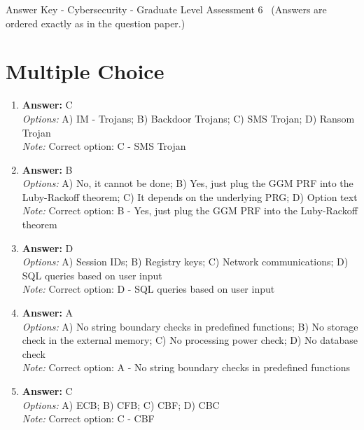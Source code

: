 \documentclass[12pt]{article}
\begin{document}
\begin{center}
Answer Key - Cybersecurity - Graduate Level Assessment 6 \
\small (Answers are ordered exactly as in the question paper.)
\end{center}

\section*{Multiple Choice}
\begin{enumerate}[label=\arabic*.]
\item \textbf{Answer:} C
\\ \textit{Options:} A) IM - Trojans; B) Backdoor Trojans; C) SMS Trojan; D) Ransom Trojan
\\ \textit{Note:} Correct option: C - SMS Trojan
\item \textbf{Answer:} B
\\ \textit{Options:} A) No, it cannot be done; B) Yes, just plug the GGM PRF into the Luby-Rackoff theorem; C) It depends on the underlying PRG; D) Option text
\\ \textit{Note:} Correct option: B - Yes, just plug the GGM PRF into the Luby-Rackoff theorem
\item \textbf{Answer:} D
\\ \textit{Options:} A) Session IDs; B) Registry keys; C) Network communications; D) SQL queries based on user input
\\ \textit{Note:} Correct option: D - SQL queries based on user input
\item \textbf{Answer:} A
\\ \textit{Options:} A) No string boundary checks in predefined functions; B) No storage check in the external memory; C) No processing power check; D) No database check
\\ \textit{Note:} Correct option: A - No string boundary checks in predefined functions
\item \textbf{Answer:} C
\\ \textit{Options:} A) ECB; B) CFB; C) CBF; D) CBC
\\ \textit{Note:} Correct option: C - CBF
\end{enumerate}
\end{document}
